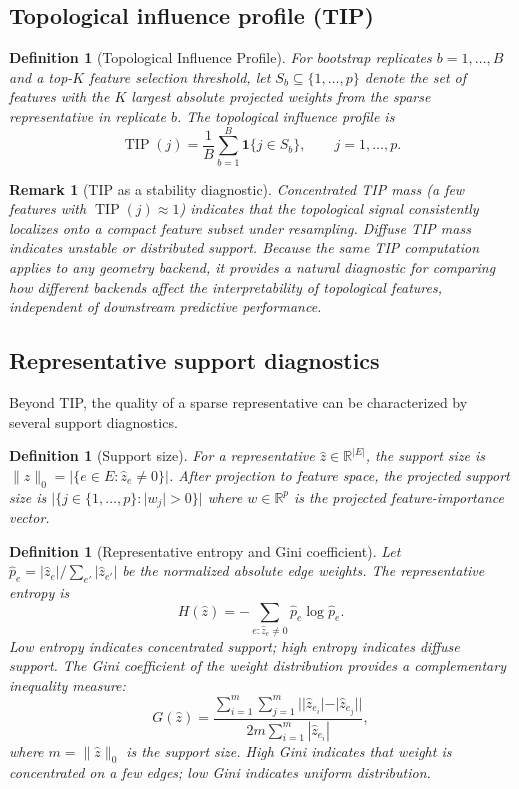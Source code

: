 \documentclass[11pt]{article}
\newtheorem{definition}[theorem]{Definition}
\newtheorem{remark}[theorem]{Remark}
\DeclareMathOperator{\TIP}{TIP}
\begin{document}
\subsection{Topological influence profile (TIP)}
\label{sec:tip}

\begin{definition}[Topological Influence Profile]\label{def:tip}
For bootstrap replicates $b = 1, \ldots, B$ and a top-$K$ feature selection threshold, let $S_b \subseteq \{1, \ldots, p\}$ denote the set of features with the $K$ largest absolute projected weights from the sparse representative in replicate $b$.
The \emph{topological influence profile} is
\[
\TIP(j) = \frac{1}{B} \sum_{b=1}^B \mathbf{1}\{j \in S_b\}, \qquad j = 1, \ldots, p.
\]
\end{definition}

\begin{remark}[TIP as a stability diagnostic]\label{rem:tipstability}
Concentrated TIP mass (a few features with $\TIP(j) \approx 1$) indicates that the topological signal consistently localizes onto a compact feature subset under resampling.
Diffuse TIP mass indicates unstable or distributed support.
Because the same TIP computation applies to any geometry backend, it provides a natural diagnostic for comparing how different backends affect the \emph{interpretability} of topological features, independent of downstream predictive performance.
\end{remark}

\subsection{Representative support diagnostics}
\label{sec:diagnostics_math}

Beyond TIP, the quality of a sparse representative can be characterized by several support diagnostics.

\begin{definition}[Support size]\label{def:support}
For a representative $\hat{z} \in \mathbb{R}^{|E|}$, the \emph{support size} is $\|\hat{z}\|_0 = |\{e \in E : \hat{z}_e \ne 0\}|$.
After projection to feature space, the \emph{projected support size} is $|\{j \in \{1,\ldots,p\} : |w_j| > 0\}|$ where $w \in \mathbb{R}^p$ is the projected feature-importance vector.
\end{definition}

\begin{definition}[Representative entropy and Gini coefficient]\label{def:entropy}
Let $\hat{p}_e = |\hat{z}_e| / \sum_{e'} |\hat{z}_{e'}|$ be the normalized absolute edge weights.
The \emph{representative entropy} is
\[
H(\hat{z}) = -\sum_{e : \hat{z}_e \ne 0} \hat{p}_e \log \hat{p}_e.
\]
Low entropy indicates concentrated support; high entropy indicates diffuse support.
The \emph{Gini coefficient} of the weight distribution provides a complementary inequality measure:
\[
G(\hat{z}) = \frac{\sum_{i=1}^m \sum_{j=1}^m ||\hat{z}_{e_i}| - |\hat{z}_{e_j}||}{2m \sum_{i=1}^m |\hat{z}_{e_i}|},
\]
where $m = \|\hat{z}\|_0$ is the support size.
High Gini indicates that weight is concentrated on a few edges; low Gini indicates uniform distribution.
\end{definition}
\end{document}
